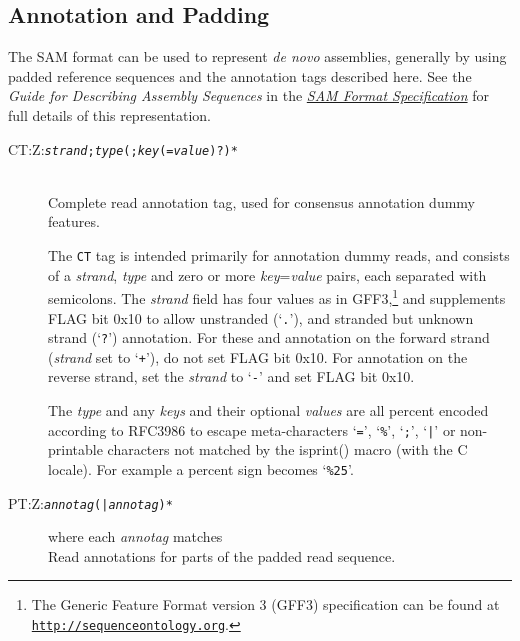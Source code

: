 \documentclass[10pt]{article}
\newcommand{\tagregex}[1]{{\tt #1}}
\newcommand{\metavar}[1]{{\rm\emph{#1}}}
\begin{document}
\subsection{Annotation and Padding}

The SAM format can be used to represent \emph{de novo} assemblies, generally by using padded reference sequences and the annotation tags described here.
See the \emph{Guide for Describing Assembly Sequences} in the \href{http://samtools.github.io/hts-specs/SAMv1.pdf}{\emph{SAM Format Specification}} for full details of this representation.

\begin{description}
\item[CT:Z:\tagregex{\metavar{strand};\metavar{type}(;\metavar{key}(=\metavar{value})?)*}]
\hfill\\
Complete read annotation tag, used for consensus annotation dummy features.

The {\tt CT} tag is intended primarily for annotation
dummy reads, and consists of a \emph{strand}, \emph{type} and zero or
more \emph{key}=\emph{value} pairs, each separated with semicolons.
The \emph{strand} field has four values as in GFF3,\footnote{The
Generic Feature Format version 3 (GFF3) specification can be found at
\href{http://www.sequenceontology.org/}{\tt http://sequenceontology.org}.}
and supplements FLAG
bit 0x10 to allow unstranded (`{\tt .}'), and stranded but unknown strand
(`{\tt ?}') annotation. For these and annotation on the forward strand
(\emph{strand} set to `{\tt +}'), do not set FLAG bit 0x10. For
annotation on the reverse strand, set the \emph{strand} to `{\tt -}'
and set FLAG bit 0x10.

The \emph{type} and any \emph{keys} and their
optional \emph{values} are all percent encoded according to
RFC3986 to escape meta-characters `{\tt =}', `{\tt \%}', `{\tt ;}',
`{\tt |}' or non-printable characters not matched by the isprint()
macro (with the C locale). For example a percent sign becomes
`{\tt \%25}'.

\item[PT:Z:\tagregex{\metavar{annotag}(|\metavar{annotag})*}]\enskip where each \metavar{annotag} matches\quad\tagregex{\metavar{start};\metavar{end};\metavar{strand};\metavar{type}(;\metavar{key}(=\metavar{value})?)*}
\hfill\\
Read annotations for parts of the padded read sequence.


\end{description}
\end{document}
